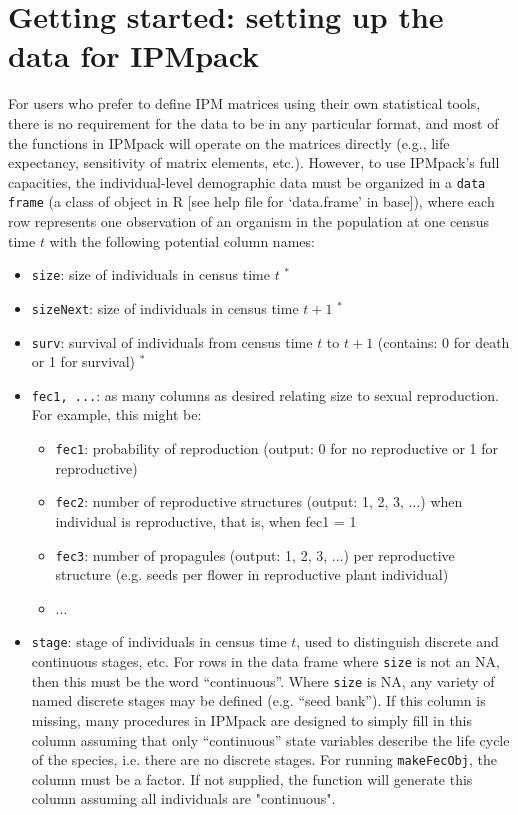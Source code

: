 \documentclass{article}
\begin{document}
\section{Getting started: setting up the data for IPMpack}
For users who prefer to define IPM matrices using their own
statistical tools, there is no requirement for the data to be in any
particular format, and most of the functions in IPMpack will operate
on the matrices directly (e.g., life expectancy, sensitivity of matrix
elements, etc.).  However, to use IPMpack's full capacities, the
individual-level demographic data must be organized in a {\tt data frame} (a
class of object in R [see help file for `data.frame' in base]), where each row
represents one observation of an organism in the population at one census time
$t$ with the following potential column names:
\begin{itemize}
\item  {\tt size}: size of individuals in census time $t$  $^*$
\item  {\tt sizeNext}: size of individuals in census time $t+1$  $^*$
\item  {\tt surv}: survival of individuals from census time $t$ to  $t+1$ (contains: 0 for death or 1 for survival) $^*$
\item  {\tt fec1, ...}: as many columns as desired relating size to sexual reproduction. For example, this might be: 
  \begin{itemize}
  \item {\tt fec1}: probability of reproduction (output: 0 for no reproductive or 1 for reproductive)
  \item {\tt fec2}: number of reproductive structures (output: 1, 2, 3, $...$) when individual is reproductive, that is, when fec1 = 1
  \item {\tt fec3}: number of propagules (output: 1, 2, 3, $...$) per reproductive structure (e.g. seeds per flower in reproductive plant individual)
  \item ...
  \end{itemize}
\item  {\tt stage}: stage of individuals in census time $t$, used to
  distinguish discrete and continuous stages, etc. For rows in the  data frame where {\tt size} is not an NA, then this must be the word ``continuous''. Where {\tt size} is NA, any variety of named discrete stages  may be defined (e.g. ``seed bank''). If this column is missing, many procedures in IPMpack are designed to simply fill in this column assuming that only ``continuous'' state variables describe the life cycle of the species, i.e. there are no discrete stages. For running {\tt makeFecObj}, the column must be a factor. If not supplied, the function will generate this column assuming all individuals are "continuous".

\end{itemize}
\end{document}
